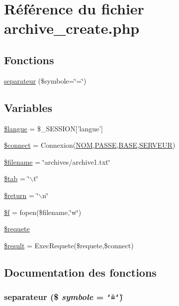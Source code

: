 \hypertarget{archive__create_8php}{
\section{R\'{e}f\'{e}rence du fichier archive\_\-create.php}
\label{archive__create_8php}
}
\subsection*{Fonctions}
\begin{CompactItemize}
\item 
\hyperlink{archive__create_8php_a8}{separateur} (\$symbole=\char`\"{}=\char`\"{})
\end{CompactItemize}
\subsection*{Variables}
\begin{CompactItemize}
\item 
\hyperlink{archive__create_8php_a0}{\$langue} = \$\_\-SESSION\mbox{[}'langue'\mbox{]}
\item 
\hyperlink{archive__create_8php_a1}{\$connect} = Connexion(\hyperlink{pma__connect_8php_a0}{NOM},\hyperlink{pma__connect_8php_a1}{PASSE},\hyperlink{pma__connect_8php_a3}{BASE},\hyperlink{pma__connect_8php_a2}{SERVEUR})
\item 
\hyperlink{archive__create_8php_a2}{\$filename} = \char`\"{}archives/archive1.txt\char`\"{}
\item 
\hyperlink{archive__create_8php_a3}{\$tab} = \char`\"{}$\backslash$t\char`\"{}
\item 
\hyperlink{archive__create_8php_a4}{\$return} = \char`\"{}$\backslash$n\char`\"{}
\item 
\hyperlink{archive__create_8php_a5}{\$f} = fopen(\$filename,\char`\"{}w\char`\"{})
\item 
\hyperlink{archive__create_8php_a6}{\$requete}
\item 
\hyperlink{archive__create_8php_a7}{\$result} = Exec\-Requete(\$requete,\$connect)
\end{CompactItemize}


\subsection{Documentation des fonctions}
\hypertarget{archive__create_8php_a8}{
\subsubsection[separateur]{\setlength{\rightskip}{0pt plus 5cm}separateur (\$ {\em symbole} = {\tt \char`\"{}=\char`\"{}})}}
\label{archive__create_8php_a8}




